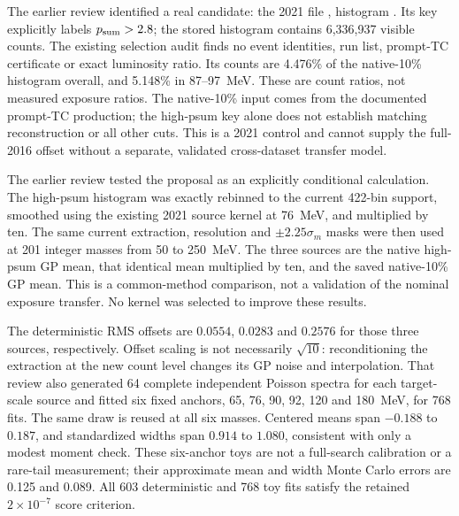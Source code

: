 \label{sec:physics-onepercent}
The earlier review identified a real candidate: the 2021 file , histogram . Its key explicitly labels $p_{\rm sum}>2.8$; the stored histogram contains 6,336,937 visible counts. The existing selection audit finds no event identities, run list, prompt-TC certificate or exact luminosity ratio. Its counts are 4.476\% of the native-10\% histogram overall, and 5.148\% in 87--97~MeV. These are count ratios, not measured exposure ratios. The native-10\% input comes from the documented prompt-TC production; the high-psum key alone does not establish matching reconstruction or all other cuts. This is a 2021 control and cannot supply the full-2016 offset without a separate, validated cross-dataset transfer model.

The earlier review tested the proposal as an explicitly conditional calculation. The high-psum histogram was exactly rebinned to the current 422-bin support, smoothed using the existing 2021 source kernel at 76~MeV, and multiplied by ten. The same current extraction, resolution and $\pm2.25\sigma_m$ masks were then used at 201 integer masses from 50 to 250~MeV. The three sources are the native high-psum GP mean, that identical mean multiplied by ten, and the saved native-10\% GP mean. This is a common-method comparison, not a validation of the nominal exposure transfer. No kernel was selected to improve these results.


The deterministic RMS offsets are $0.0554$, $0.0283$ and $0.2576$ for those three sources, respectively. Offset scaling is not necessarily $\sqrt{10}$: reconditioning the extraction at the new count level changes its GP noise and interpolation. That review also generated 64 complete independent Poisson spectra for each target-scale source and fitted six fixed anchors, 65, 76, 90, 92, 120 and 180~MeV, for 768 fits. The same draw is reused at all six masses. Centered means span $-0.188$ to $0.187$, and standardized widths span $0.914$ to $1.080$, consistent with only a modest moment check. These six-anchor toys are not a full-search calibration or a rare-tail measurement; their approximate mean and width Monte Carlo errors are 0.125 and 0.089. All 603 deterministic and 768 toy fits satisfy the retained $2\times10^{-7}$ score criterion.

